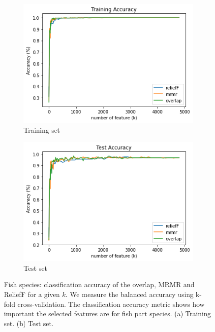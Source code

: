 \documentclass[runningheads]{llncs}
\begin{document}
\begin{figure}[htb]
  \centering
  \begin{subfigure}[b]{\linewidth}
    \includegraphics[width=1\linewidth]{fish_k_accuracy_train.png}
    \caption{Training set}
    \label{fig:fish-k-accuracy-train}
  \end{subfigure}

  \begin{subfigure}[b]{\linewidth}
    \includegraphics[width=1\linewidth]{fish_k_accuracy_test.png}
    \caption{Test set}
    \label{fig:fish-k-accuracy-test}
  \end{subfigure}
  \caption[Two numerical solutions]{
    Fish species: classification accuracy of the overlap, MRMR and ReliefF for a given $k$.
    We measure the balanced accuracy using k-fold cross-validation.
    The classification accuracy metric shows how important the selected features are for fish part species.
    (a) Training set. (b) Test set.}
\end{figure}
\end{document}

